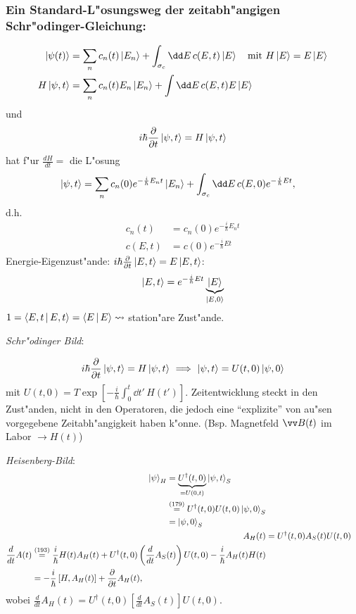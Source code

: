 \documentclass[a4paper]{scrartcl}
\begin{document}
{\subsubsection*{Ein Standard-L"osungsweg der zeitabh"angigen Schr"odinger-Gleichung:}
\begin{align*}
\Ket{ \psi(t) } & = \sum_n c_n(t) \Ket{ E_n} + \int_{\sigma_c} \dd E \, c(E, t) \Ket{E} \quad \mathrm{ mit \ } H \Ket{E} = E \Ket{E} \\
H \Ket{ \psi, t} & = \sum_n c_n(t) E_n \Ket{ E_n } + \int \dd E \, c(E,t) E \Ket E
\end{align*}
und
$$i \hbar \frac \partial {\partial t} \Ket{ \psi, t} = H \Ket{ \psi, t}$$
hat f"ur $\frac {dH}{dt} = $ die L"osung
\begin{align}
\Ket{ \psi, t} & = \sum_n c_n(0) e^{- \frac i \hbar E_n t} \Ket{ E_n} + \int_{\sigma_c} \dd E \, c(E, 0) e^{- \frac i \hbar E t},
\end{align}
d.h.
\begin{align*}
c_n(t) & = c_n(0) e^{- \frac i \hbar E_n t} \\
c(E,t) & = c(0) e^{- \frac i \hbar E t}
\end{align*}
Energie-Eigenzust"ande: $i \hbar \frac \partial {\partial t} \ket{ E, t} = E \Ket{ E, t}$:
$$\Ket{ E, t} = e^{- \frac i \hbar E t} \underbrace{ \Ket{ E }}_{ \Ket{ E, 0}}$$
$1 = \Braket { E,t | E, t} = \Braket{ E | E} \leadsto$ station"are Zust"ande.

\emph{Schr"odinger Bild}:

\begin{align}
i \hbar \frac{ \partial}{\partial t} \Ket{ \psi, t} = H \Ket{ \psi , t} \ \Longrightarrow \ \Ket{ \psi, t} = U(t,0) \Ket{ \psi, 0}
\end{align}
mit $U(t, 0) = T \exp \left[ - \frac i \hbar \int_0^t \dd t' \, H(t') \right]$. Zeitentwicklung steckt in den Zust"anden, nicht in den Operatoren, die jedoch eine "`explizite"' von au"sen vorgegebene Zeitabh"angigkeit haben k"onne. (Bsp. Magnetfeld $\vv B(t)$ im Labor $\rightarrow H(t)$)

\emph{Heisenberg-Bild}:
\begin{align}
\begin{split}
\Ket \psi_H & = \underbrace{ U^\dagger(t,0)}_{=U(0,t)} \Ket {\psi, t}_S \\
& \stackrel{(179)}= U^\dagger(t,0) U(t,0) \Ket{ \psi, 0}_S \\
& = \Ket{ \psi, 0}_S
\end{split} \\
A_H(t) & = U^\dagger(t,0) A_S(t) U(t,0) \\
\begin{split}
\frac d {dt} A(t) & \stackrel{(193)}= \frac i \hbar H(t) A_H(t) + U^\dagger (t,0) \left( \frac d {dt} A_S(t) \right) U(t,0) - \frac i \hbar A_H(t) H(t) \\
& = - \frac i \hbar \left[ H, A_H(t) \right] + \frac \partial {\partial t} A_H(t),
\end{split}
\end{align}
wobei $\frac d {dt} A_H(t) = U^\dagger(t,0) \left[ \frac d {dt} A_S(t) \right] U(t,0)$.

}
\end{document}
